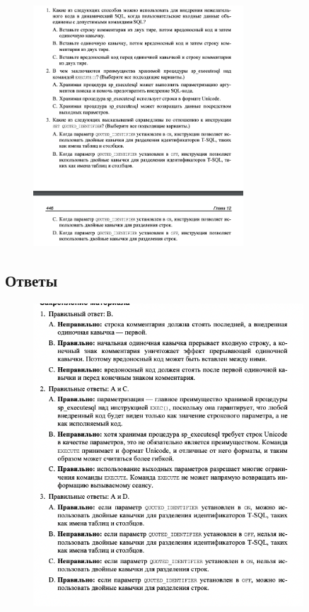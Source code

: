 \begin{figure}[h!]
	\begin{center}
		\includegraphics[width=0.7\textwidth]{img/zakrep28.png}
	\end{center}
	\captionsetup{justification=centering}
\end{figure}
\clearpage

\subsection*{Ответы}

\begin{figure}[h!]
	\begin{center}
		\includegraphics[width=0.9\textwidth]{img/ans29.png}
	\end{center}
	\captionsetup{justification=centering}
\end{figure}


